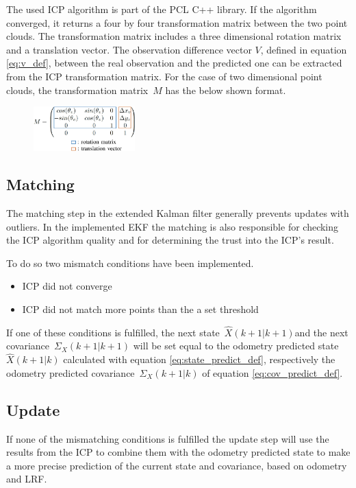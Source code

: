 The used ICP algorithm is part of the PCL C++ library. If the algorithm converged, it returns a four by four transformation matrix between the two point clouds. The transformation matrix includes a three dimensional rotation matrix and a translation vector. The observation difference vector $V$, defined in equation \eqref{eq:v_def}, between the real observation and the predicted one can be extracted from the ICP transformation matrix. For the case of two dimensional point clouds, the transformation \mbox{matrix $M$} has the below shown format.
\begin{figure}[h!]
\centering
\includegraphics[width=0.35\textwidth]{figures/M}
      \label{fig:transformation_matrix}
\end{figure}

\subsection{Matching}
\label{subsec:Matching}
The matching step in the extended Kalman filter generally prevents updates with outliers. In the implemented EKF the matching is also responsible for checking the ICP algorithm quality and for determining the trust into the ICP's result. 

To do so two mismatch conditions have been implemented.
\begin{itemize}
\item ICP did not converge
\item ICP did not match more points than the a set threshold
\end{itemize}
If one of these conditions is fulfilled, the next \mbox{state $\hat{X}(k+1|k+1)$}and the next \mbox{covariance $\Sigma_X (k+1|k+1)$} will be set equal to the odometry predicted \mbox{state $\hat{X}(k+1|k)$} calculated with equation \eqref{eq:state_predict_def}, respectively the odometry predicted \mbox{covariance $\Sigma_{X}(k+1|k)$} of equation \eqref{eq:cov_predict_def}.

\subsection{Update}
\label{subsec:Update}
If none of the mismatching conditions is fulfilled the update step will use the results from the ICP to combine them with the odometry predicted state to make a more precise prediction of the current state and covariance, based on odometry and LRF. 

